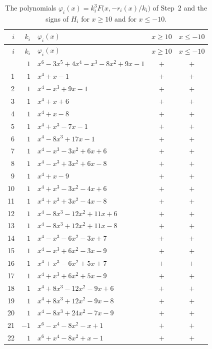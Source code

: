 \documentclass[11pt]{article}
\begin{document}
\begingroup\footnotesize
\setlength{\LTcapwidth}{\textwidth}
\begin{longtable}{@{}rrlcc@{}}
\caption{The polynomials $\varphi_i(x)=k_i^3F\bigl(x,-r_i(x)/k_i\bigr)$ of Step~2 and the signs of $H_i$ for $x\geq10$ and for $x\leq-10$.}\label{tab:phi}\\
\hline $i$ & $k_i$ & $\varphi_i(x)$ & $x\geq10$ & $x\leq-10$\\\hline\endfirsthead\hline $i$ & $k_i$ & $\varphi_i(x)$ & $x\geq10$ & $x\leq-10$\\\hline\endhead\hline\endfoot
0 & $1$ & $x^{6}-3x^{5}+4x^{4}-x^{3}-8x^{2}+9x-1$ & $+$ & $+$\\
1 & $1$ & $x^{4}+x-1$ & $+$ & $+$\\
2 & $1$ & $x^{4}-x^{3}+9x-1$ & $+$ & $+$\\
3 & $1$ & $x^{4}+x+6$ & $+$ & $+$\\
4 & $1$ & $x^{4}+x-8$ & $+$ & $+$\\
5 & $1$ & $x^{4}+x^{3}-7x-1$ & $+$ & $+$\\
6 & $1$ & $x^{4}-8x^{3}+17x-1$ & $+$ & $+$\\
7 & $1$ & $x^{4}-x^{3}-3x^{2}+6x+6$ & $+$ & $+$\\
8 & $1$ & $x^{4}-x^{3}+3x^{2}+6x-8$ & $+$ & $+$\\
9 & $1$ & $x^{4}+x-9$ & $+$ & $+$\\
10 & $1$ & $x^{4}+x^{3}-3x^{2}-4x+6$ & $+$ & $+$\\
11 & $1$ & $x^{4}+x^{3}+3x^{2}-4x-8$ & $+$ & $+$\\
12 & $1$ & $x^{4}-8x^{3}-12x^{2}+11x+6$ & $+$ & $+$\\
13 & $1$ & $x^{4}-8x^{3}+12x^{2}+11x-8$ & $+$ & $+$\\
14 & $1$ & $x^{4}-x^{3}-6x^{2}-3x+7$ & $+$ & $+$\\
15 & $1$ & $x^{4}-x^{3}+6x^{2}-3x-9$ & $+$ & $+$\\
16 & $1$ & $x^{4}+x^{3}-6x^{2}+5x+7$ & $+$ & $+$\\
17 & $1$ & $x^{4}+x^{3}+6x^{2}+5x-9$ & $+$ & $+$\\
18 & $1$ & $x^{4}+8x^{3}-12x^{2}-9x+6$ & $+$ & $+$\\
19 & $1$ & $x^{4}+8x^{3}+12x^{2}-9x-8$ & $+$ & $+$\\
20 & $1$ & $x^{4}-8x^{3}+24x^{2}-7x-9$ & $+$ & $+$\\
21 & $-1$ & $x^{6}-x^{4}-8x^{2}-x+1$ & $+$ & $+$\\
22 & $1$ & $x^{6}+x^{4}-8x^{2}+x-1$ & $+$ & $+$\\

\end{longtable}
\end{document}
